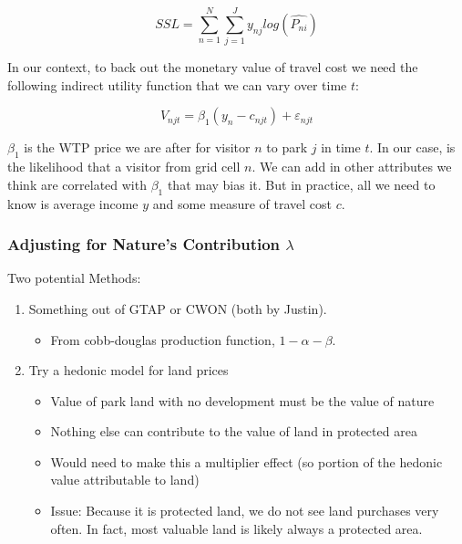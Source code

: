 \documentclass[
  letterpaper,
  DIV=11,
  numbers=noendperiod]{scrartcl}
\providecommand{\tightlist}{%
  \setlength{\itemsep}{0pt}\setlength{\parskip}{0pt}}\usepackage{longtable,booktabs,array}
\begin{document}
\[
SSL = \sum_{n=1}^N \sum_{j=1}^J y_{nj} log(\hat{P_{ni}})
\]

In our context, to back out the monetary value of travel cost we need
the following indirect utility function that we can vary over time
\(t\):

\[
V_{njt} = \beta_1 (y_n - c_{njt}) + \varepsilon_{njt}
\]

\(\beta_1\) is the WTP price we are after for visitor \(n\) to park
\(j\) in time \(t\). In our case, is the likelihood that a visitor from
grid cell \(n\). We can add in other attributes we think are correlated
with \(\beta_1\) that may bias it. But in practice, all we need to know
is average income \(y\) and some measure of travel cost \(c\).

\hypertarget{adjusting-for-natures-contribution-lambda}{%
\subsubsection{\texorpdfstring{Adjusting for Nature's Contribution
\(\lambda\)}{Adjusting for Nature's Contribution \textbackslash lambda}}\label{adjusting-for-natures-contribution-lambda}}

Two potential Methods:

\begin{enumerate}
\def\labelenumi{\arabic{enumi}.}
\tightlist
\item
  Something out of GTAP or CWON (both by Justin).

  \begin{itemize}
  \tightlist
  \item
    From cobb-douglas production function, \(1 - \alpha - \beta\).
  \end{itemize}
\item
  Try a hedonic model for land prices

  \begin{itemize}
  \tightlist
  \item
    Value of park land with no development must be the value of nature
  \item
    Nothing else can contribute to the value of land in protected area
  \item
    Would need to make this a multiplier effect (so portion of the
    hedonic value attributable to land)
  \item
    Issue: Because it is protected land, we do not see land purchases
    very often. In fact, most valuable land is likely always a protected
    area.
  \end{itemize}
\end{enumerate}
\end{document}

